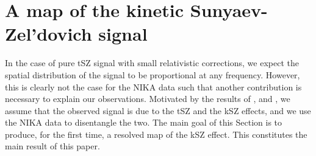 \documentclass[twocolumn,traditabstract]{aa}
\begin{document}
\section{A map of the kinetic Sunyaev-Zel'dovich signal}\label{sec:A_map_of_the_kinetic_Sunyaev_Zel_dovich_signal}
In the case of pure tSZ signal with small relativistic corrections, we expect the spatial distribution of the signal to be proportional at any frequency. However, this is clearly not the case for the NIKA data such that another contribution is necessary to explain our observations. Motivated by the results of \cite{Ma2009}, \cite{Mroczkowski2012} and \cite{Sayers2013}, we assume that the observed signal is due to the tSZ and the kSZ effects, and we use the NIKA data to disentangle the two. The main goal of this Section is to produce, for the first time, a resolved map of the kSZ effect. This constitutes the main result of this paper.

\end{document}
